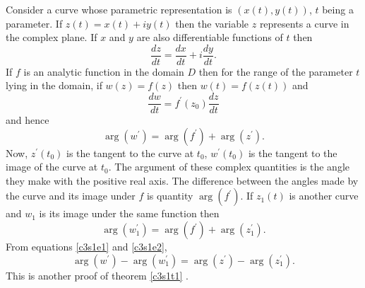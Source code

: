 Consider a curve whose parametric representation is $(x(t), y(t))$, $t$ 
being a parameter. If $z(t) = x(t) + iy(t)$ then the variable $z$ represents
a curve in the complex plane. If $x$ and $y$ are also differentiable functions
of $t$ then
\[
\frac{dz}{dt} = \frac{dx}{dt} + i\frac{dy}{dt}.
\]
If $f$ is an analytic function in the domain $D$ then for the range of the
parameter $t$ lying in the domain, if $w(z) = f(z)$ then $w(t) = f(z(t))$ and
\[
\frac{dw}{dt} = f^\prime(z_0)\frac{dz}{dt}
\]
and hence
\begin{equation}\label{c3s1e1}
\arg(w^\prime) = \arg(f^\prime) + \arg(z^\prime).
\end{equation}
Now, $z^\prime(t_0)$ is the tangent to the curve at $t_0$, $w^\prime(t_0)$ is
the tangent to the image of the curve at $t_0$. The argument of these complex
quantities is the angle they make with the positive real axis. The difference 
between the angles made by the curve and its image under $f$ is quantity
$\arg(f^\prime)$. If $z_1(t)$ is another curve and $w_1$ is its image under
the same function then
\begin{equation}\label{c3s1e2}
\arg(w_1^\prime) = \arg(f^\prime) + \arg(z_1^\prime).
\end{equation}
From equations \eqref{c3s1e1} and \eqref{c3s1e2},
\begin{equation}\label{c3s1e3}
\arg(w^\prime) - \arg(w_1^\prime) = \arg(z^\prime) - \arg(z_1^\prime).
\end{equation}
This is another proof of theorem \ref{c3s1t1} \cite{ablowitz2003complex}.

